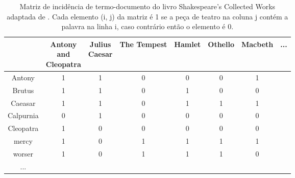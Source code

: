 \begin{table}[h]
    \centering
    \begin{tabular}{|c|c|c|c|c|c|c|c}\hline
         \diagbox{Palavra}{\raisebox{-1.27cm}{\rotatebox{90}{\parbox{1.6cm}{\centering Peça \\ de teatro}}}} & \makecell{Antony \\ and \\ Cleopatra} & \makecell{Julius \\ Caesar} & The Tempest & Hamlet & Othello & Macbeth & ... \\ \hline
         Antony     & 1 & 1 & 0 & 0 & 0 & 1 & \\
         Brutus     & 1 & 1 & 0 & 1 & 0 & 0 & \\
         Caeasar    & 1 & 1 & 0 & 1 & 1 & 1 & \\
         Calpurnia  & 0 & 1 & 0 & 0 & 0 & 0 & \\
         Cleopatra  & 1 & 0 & 0 & 0 & 0 & 0 & \\
         mercy      & 1 & 0 & 1 & 1 & 1 & 1 & \\
         worser     & 1 & 0 & 1 & 1 & 1 & 0 & \\
         ...        & & & & & & & 
    \end{tabular}
    \caption{Matriz de incidência de termo-documento do livro Shakespeare’s Collected Works adaptada de . Cada elemento (i, j) da matriz é 1 se a peça de teatro na coluna j contém a palavra na linha i, caso contrário então o elemento é 0.}
    \label{tab:matriz-incidência-termo-documento}
\end{table}